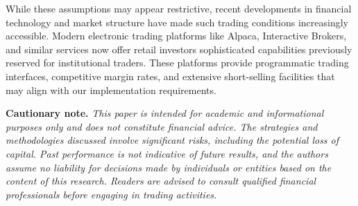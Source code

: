 While these assumptions may appear restrictive, recent developments in financial technology and market structure have made such trading conditions increasingly accessible. Modern electronic trading platforms like Alpaca, Interactive Brokers, and similar services now offer retail investors sophisticated capabilities previously reserved for institutional traders. These platforms provide programmatic trading interfaces, competitive margin rates, and extensive short-selling facilities that may align with our implementation requirements.


\textbf{Cautionary note.} \textit{This paper is intended for academic and informational purposes only and does not constitute financial advice. The strategies and methodologies discussed involve significant risks, including the potential loss of capital. Past performance is not indicative of future results, and the authors assume no liability for decisions made by individuals or entities based on the content of this research. Readers are advised to consult qualified financial professionals before engaging in trading activities.}